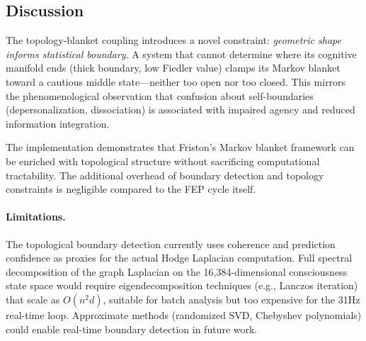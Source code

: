 \subsection{Discussion}

The topology-blanket coupling introduces a novel constraint: \emph{geometric shape
informs statistical boundary}. A system that cannot determine where its cognitive
manifold ends (thick boundary, low Fiedler value) clamps its Markov blanket toward
a cautious middle state---neither too open nor too closed. This mirrors the
phenomenological observation that confusion about self-boundaries (depersonalization,
dissociation) is associated with impaired agency and reduced information integration.

The implementation demonstrates that Friston's Markov blanket framework can be
enriched with topological structure without sacrificing computational tractability.
The additional overhead of boundary detection and topology constraints is negligible
compared to the FEP cycle itself.

\paragraph{Limitations.}
The topological boundary detection currently uses coherence and prediction confidence
as proxies for the actual Hodge Laplacian computation. Full spectral decomposition
of the graph Laplacian on the 16,384-dimensional consciousness state space would
require eigendecomposition techniques (e.g., Lanczos iteration) that scale as
$O(n^2 d)$, suitable for batch analysis but too expensive for the 31Hz real-time
loop. Approximate methods (randomized SVD, Chebyshev polynomials) could enable
real-time boundary detection in future work.
